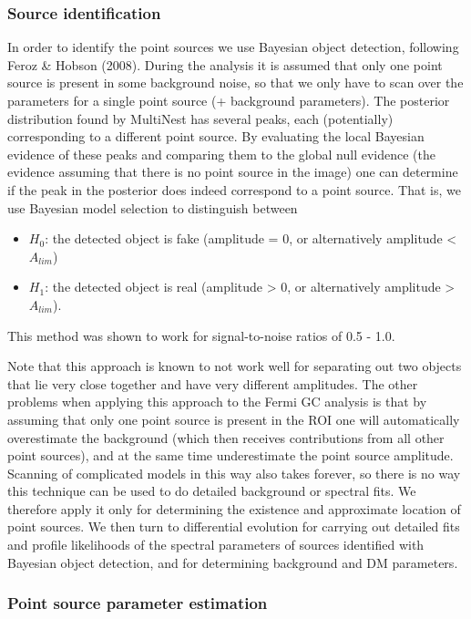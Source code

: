 \documentclass{article}
\begin{document}
\subsubsection{Source identification}

In order to identify the point sources we use Bayesian object detection, following Feroz \& Hobson (2008). During the analysis it is assumed that only one point source is present in some background noise, so that we only have to scan over the parameters for a single point source (+ background parameters). The posterior distribution found by MultiNest has several peaks, each (potentially) corresponding to a different point source. By evaluating the local Bayesian evidence of these peaks and comparing them to the global null evidence (the evidence assuming that there is no point source in the image) one can determine if the peak in the posterior does indeed correspond to a point source. That is, we use Bayesian model selection to distinguish between
\begin{itemize}
\item $H_0$: the detected object is fake (amplitude  = 0, or alternatively amplitude < $A_{lim}$)
\item $H_1$: the detected object is real (amplitude > 0, or alternatively amplitude > $A_{lim}$).
\end{itemize}

This method was shown to work for signal-to-noise ratios of 0.5 - 1.0.

Note that this approach is known to not work well for separating out two objects that lie very close together and have very different amplitudes.  The other problems when applying this approach to the Fermi GC analysis is that by assuming that only one point source is present in the ROI one will automatically overestimate the background (which then receives contributions from all other point sources), and at the same time underestimate the point source amplitude. Scanning of complicated models in this way also takes forever, so there is no way this technique can be used to do detailed background or spectral fits.  We therefore apply it only for determining the existence and approximate location of point sources.  We then turn to differential evolution for carrying out detailed fits and profile likelihoods of the spectral parameters of sources identified with Bayesian object detection, and for determining background and DM parameters.

\subsubsection{Point source parameter estimation}
\end{document}
